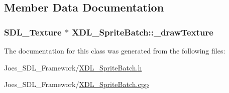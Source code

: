 \subsection{Member Data Documentation}
\hypertarget{class_x_d_l___sprite_batch_a37476782380898a316c9bb7a09aeee0d}{
\subsubsection[{\-\_\-draw\-Texture}]{\setlength{\rightskip}{0pt plus 5cm}S\-D\-L\-\_\-\-Texture $\ast$ X\-D\-L\-\_\-\-Sprite\-Batch\-::\-\_\-draw\-Texture\hspace{0.3cm}{\ttfamily [static]}}}\label{class_x_d_l___sprite_batch_a37476782380898a316c9bb7a09aeee0d}


The documentation for this class was generated from the following files\-:\begin{DoxyCompactItemize}
\item 
Joes\-\_\-\-S\-D\-L\-\_\-\-Framework/\hyperlink{_x_d_l___sprite_batch_8h}{X\-D\-L\-\_\-\-Sprite\-Batch.\-h}\item 
Joes\-\_\-\-S\-D\-L\-\_\-\-Framework/\hyperlink{_x_d_l___sprite_batch_8cpp}{X\-D\-L\-\_\-\-Sprite\-Batch.\-cpp}\end{DoxyCompactItemize}
